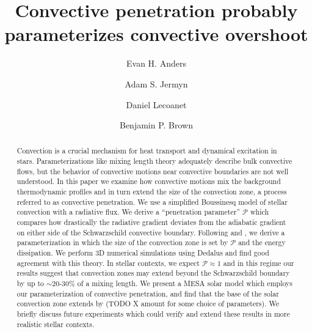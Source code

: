 \documentclass[twocolumn]{aastex631}
\newcommand{\mP}{\ensuremath{\mathcal{P}}}
\begin{document}
\title{Convective penetration probably parameterizes convective overshoot}
\author[0000-0002-3433-4733]{Evan H. Anders}
\author[0000-0001-5048-9973]{Adam S. Jermyn}
\author[0000-0002-7635-9728]{Daniel Lecoanet}
\author[0000-0001-8935-219X]{Benjamin P. Brown}


\begin{abstract}
Convection is a crucial mechanism for heat transport and dynamical excitation in stars.
Parameterizations like mixing length theory adequately describe bulk convective flows, but the behavior of convective motions near convective boundaries are not well understood.
In this paper we examine how convective motions mix the background thermodynamic profiles and in turn extend the size of the convection zone, a process referred to as convective penetration.
We use a simplified Boussinesq model of stellar convection with a radiative flux.
We derive a ``penetration parameter'' $\mathcal{P}$ which compares how drastically the radiative gradient deviates from the adiabatic gradient on either side of the Schwarzschild convective boundary.
Following \citet{roxburgh1989} and \citet{zahn1991}, we derive a parameterization in which the size of the convection zone is set by $\mP$ and the energy dissipation.
We perform 3D numerical simulations using Dedalus and find good agreement with this theory.
In stellar contexts, we expect $\mathcal{P} \approx 1$ and in this regime our results suggest that convection zones may extend beyond the Schwarzschild boundary by up to $\sim$20-30\% of a mixing length.
We present a MESA solar model which employs our parameterization of convective penetration, and find that the base of the solar convection zone extends by (TODO X amount for some choice of parameters).
We briefly discuss future experiments which could verify and extend these results in more realistic stellar contexts.
\end{abstract}
\end{document}
